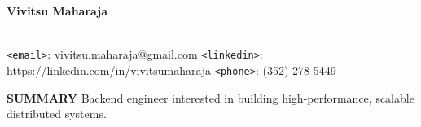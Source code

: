 \documentclass[10pt, letterpaper]{article}
\begin{document}
\begin{center}
\textbf{\Large Vivitsu Maharaja}
\date{}
\thispagestyle{empty}
\smallskip \\
\texttt{<email>}: vivitsu.maharaja@gmail.com \texttt{<linkedin>}: https://linkedin.com/in/vivitsumaharaja \texttt{<phone>}: (352) 278-5449
\end{center}

\textbf{SUMMARY}
\smallskip
\newline
Backend engineer interested in building high-performance, scalable distributed systems.
\end{document}

